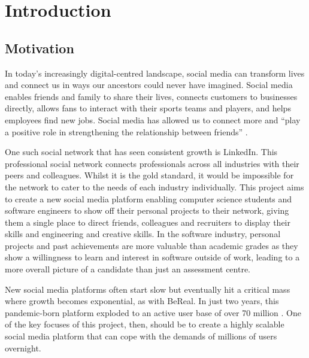 \chapter{Introduction}
\label{cha:intro}

\section{Motivation}
In today's increasingly digital-centred landscape, social media can transform lives and connect us in ways our ancestors could never have imagined.
Social media enables friends and family to share their lives, connects customers to businesses directly, allows fans to interact with their sports teams and players, and helps employees find new jobs. 
Social media has allowed us to connect more and ``play a positive role in strengthening the relationship between friends'' \citep{chen2017social}. 

One such social network that has seen consistent growth is LinkedIn. This professional social network connects professionals across all industries with their peers and colleagues.
Whilst it is the gold standard, it would be impossible for the network to cater to the needs of each industry individually.
This project aims to create a new social media platform enabling computer science students and software engineers to show off their personal projects to their network, giving them a single place to direct friends, colleagues and recruiters to display their skills and engineering and creative skills. 
In the software industry, personal projects and past achievements are more valuable than academic grades as they show a willingness to learn and interest in software outside of work, leading to a more overall picture of a candidate than just an assessment centre.

New social media platforms often start slow but eventually hit a critical mass where growth becomes exponential, as with BeReal.
In just two years, this pandemic-born platform exploded to an active user base of over 70 million \citep{curry2025bereal}. One of the key focuses of this project, then, should be to create a highly scalable social media platform that can cope with the demands of millions of users overnight.

